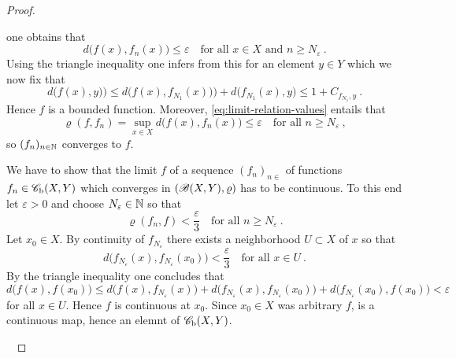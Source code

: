 \begin{proof}
\begin{adromanlist}
     one obtains that
     \begin{equation}
       \label{eq:limit-relation-values}
       d\big(f(x),f_n(x)\big) \leq \varepsilon \quad \text{for all } x \in X \text{ and } n \geq N_\varepsilon \ . 
     \end{equation}
     Using the triangle inequality one infers from this for an element $y\in Y$ which we now fix that
     \[
       d\big(f(x),y )\big) \leq  d\big(f(x),f_{N_1}(x))\big) + d\big(f_{N_1}(x),y \big) \leq
       1  +  C_{f_{N_1},y} \ . 
     \]
     Hence $f$ is a bounded function. Moreover, \eqref{eq:limit-relation-values} entails
     that
     \[
       \varrho (f,f_n) = \sup_{x\in X} d\big(f(x),f_n(x)\big) \leq \varepsilon
       \quad \text{for all } n \geq N_\varepsilon \ ,
     \]
     so $(f_n)_{n\in \mathbb{N}}$ converges to $f$. 
   \item
     We have to show that the limit $f$ of a sequence $(f_n)_{n\in}$ of functions
     $f_n \in \mathscr{C}_\textup{b} (X,Y)$ which converges in $(\mathscr{B} (X,Y),\varrho)$ has to be continuous.
     To this end let $\varepsilon >0$ and choose $N_\varepsilon \in \mathbb{N}$ so that
     \[
             \varrho (f_n,f) < \frac{\varepsilon}{3}  \quad \text{for all } n \geq N_\varepsilon \ .
     \]
     Let $x_0\in X$. By continuity of $f_{N_\varepsilon}$ there exists a neighborhood $U\subset X$ of $x$ so
     that
     \[
          d\big(f_{N_\varepsilon} (x),f_{N_\varepsilon}(x_0)\big) <  \frac{\varepsilon}{3} \quad \text{for all } x\in U \ . 
     \]
     By the triangle inequality one concludes that
     \[
       d\big(f (x),f(x_0)\big) \leq 
       d\big(f(x),f_{N_\varepsilon}(x)\big) + d\big(f_{N_\varepsilon} (x),f_{N_\varepsilon}(x_0)\big) +
       d\big(f_{N_\varepsilon} (x_0),f(x_0)\big)< \varepsilon 
     \]
     for all $x\in U$. Hence $f$ is continuous at $x_0$. Since $x_0\in X$ was arbitrary $f$, is  a continuous map,
     hence an elemnt of $\mathscr{C}_\textup{b} (X,Y)$. 
  \end{adromanlist}\mbox{ }
\end{proof}

